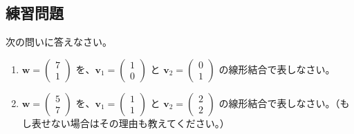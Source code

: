 \subsection{練習問題}
\begin{quiz}
次の問いに答えなさい。
\begin{enumerate}
\item $\bm{w} = \begin{pmatrix} 7 \\ 1 \end{pmatrix}$ を、$\bm{v}_1 = \begin{pmatrix} 1 \\ 0 \end{pmatrix}$ と $\bm{v}_2 = \begin{pmatrix} 0 \\ 1 \end{pmatrix}$ の線形結合で表しなさい。
\item $\bm{w} = \begin{pmatrix} 5 \\ 7 \end{pmatrix}$ を、$\bm{v}_1 = \begin{pmatrix} 1 \\ 1 \end{pmatrix}$ と $\bm{v}_2 = \begin{pmatrix} 2 \\ 2 \end{pmatrix}$ の線形結合で表しなさい。（もし表せない場合はその理由も教えてください。）
\end{enumerate}
\end{quiz}

